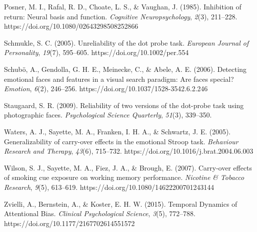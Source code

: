\documentclass{article}
\begin{document}
Posner, M. I., Rafal, R. D., Choate, L. S., \& Vaughan, J. (1985). Inhibition of return: Neural basis and function. \emph{Cognitive Neuropsychology}, \emph{2}(3), 211--228. https://doi.org/10.1080/02643298508252866

Schmukle, S. C. (2005). Unreliability of the dot probe task. \emph{European Journal of Personality}, \emph{19}(7), 595--605. https://doi.org/10.1002/per.554

Schubö, A., Gendolla, G. H. E., Meinecke, C., \& Abele, A. E. (2006). Detecting emotional faces and features in a visual search paradigm: Are faces special? \emph{Emotion}, \emph{6}(2), 246--256. https://doi.org/10.1037/1528-3542.6.2.246

Staugaard, S. R. (2009). Reliability of two versions of the dot-probe task using photographic faces. \emph{Psychological Science Quarterly}, \emph{51}(3), 339--350.

Waters, A. J., Sayette, M. A., Franken, I. H. A., \& Schwartz, J. E. (2005). Generalizability of carry-over effects in the emotional Stroop task. \emph{Behaviour Research and Therapy}, \emph{43}(6), 715--732. https://doi.org/10.1016/j.brat.2004.06.003

Wilson, S. J., Sayette, M. A., Fiez, J. A., \& Brough, E. (2007). Carry-over effects of smoking cue exposure on working memory performance. \emph{Nicotine \& Tobacco Research}, \emph{9}(5), 613--619. https://doi.org/10.1080/14622200701243144

Zvielli, A., Bernstein, A., \& Koster, E. H. W. (2015). Temporal Dynamics of Attentional Bias. \emph{Clinical Psychological Science}, \emph{3}(5), 772--788. https://doi.org/10.1177/2167702614551572
\end{document}
